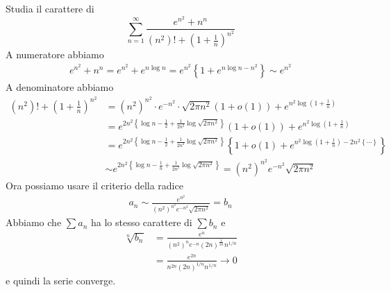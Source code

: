 \documentclass[a4paper]{article}
\begin{document}
\begin{snippetexample}{}
    Studia il carattere di
    \[
        \sum_{n=1}^\infty \frac{e^{n^2} + n^n}{(n^2)! + {\left(1 + \frac{1}{n}\right)}^{n^2}}
    \]
    A numeratore abbiamo
    \begin{align*}
        e^{n^2} + n^n = e^{n^2} + e^{n \log n} = e^{n^2}
        \left\{1 + e^{n\log n - n^2}\right\}
        \sim e^{n^2}
    \end{align*}
    A denominatore abbiamo
    \begin{align*}
        (n^2)! + {\left(1 + \frac{1}{n}\right)}^{n^2}
        &= {(n^2)}^{n^2} \cdot e^{-n^2}
        \cdot \sqrt{2\pi n^2}(1 + o(1))
        + e^{n^2 \log \left(1 + \frac{1}{n}\right)} \\
        &= e^{2n^2 \left\{
            \log n - \frac{1}{2} + \frac{1}{2n^2} \log \sqrt{2\pi n^2}
        \right\}}(1 + o(1)) + e^{n^2 \log\left(1 + \frac{1}{n}\right)}
        \\
        &= e^{2n^2 \left\{
            \log n - \frac{1}{2} + \frac{1}{2n^2} \log\sqrt{2\pi n^2}
        \right\}}
        \left\{1 + o(1) + e^{n^2\log\left(1 + \frac{1}{n}\right) - 2n^2 \left\{\cdots\right\}}\right\} \\
        &\sim e^{2n^2 \left\{
            \log n - \frac{1}{n} + \frac{1}{2n^2}
            \log\sqrt{2\pi n^2}
        \right\}}
        = {(n^2)}^{n^2} e^{-n^2} \sqrt{2\pi n^2}
    \end{align*}
    Ora possiamo usare il criterio della radice
    \begin{align*}
        a_n \sim \frac{
            e^{n^2}
        }{
            {(n^2)}^{n^2}
            e^{-n^2}
            \sqrt{2\pi n^2}
        }
        = b_n
    \end{align*}
    Abbiamo che \(\sum a_n\) ha lo stesso carattere di \(\sum b_n\)
    e
    \begin{align*}
        \sqrt[n]{b_n} &= \frac{
            e^n
        }{
            {(n^2)}^n e^{-n}
            {(2n)}^{\frac{1}{2n}} n^{1/n}
        } \\
        &= \frac{
            e^{2n}
        }{
            n^{2n} {(2n)}^{1/n} n^{1/n}
        } \to
        0
    \end{align*}
    e quindi la serie converge.
\end{snippetexample}
\end{document}
